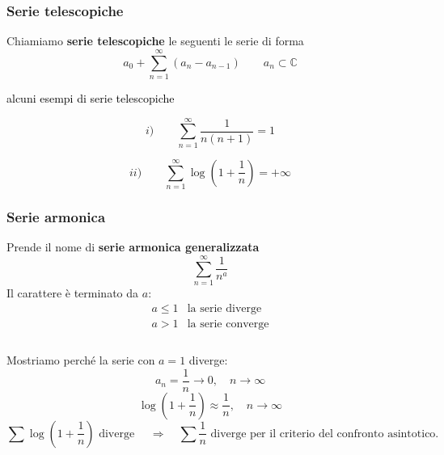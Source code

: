 \documentclass[x11names]{article}
\begin{document}
	\subsubsection{Serie telescopiche}
	Chiamiamo \textbf{serie telescopiche} le seguenti le serie di forma
	\[ 
	a_{0} + \sum_{n=1}^{\infty} (a_{n} - a_{n-1}) \qquad a_{n} \subset \mathbb{C}
	\]
	\begin{es}{\textcolor{black}{alcuni esempi di serie telescopiche}}
		\begin{minipage}{0.5\textwidth}
			\[ 
			i) \qquad \sum_{n=1}^{\infty} \frac{1}{n(n+1)} = 1
			\]
		\end{minipage}
		\begin{minipage}{0.5\textwidth}
			\[ 
			ii) \qquad \sum_{n=1}^{\infty} \log\left(1 + \frac{1}{n}\right) = +\infty
			\]
		\end{minipage}
	\end{es}
	
	\subsubsection{Serie armonica}
	Prende il nome di \textbf{serie armonica generalizzata}
	\[ 
	\sum_{n=1}^\infty \frac{1}{n^a}
	\]
	Il carattere è terminato da \(a\):
	\[ 
	\begin{array}{lc}
		a \leq 1 & \text{la serie diverge} \\
		a > 1  & \text{la serie converge} \\
	\end{array}
	\] \\
	
	\noindent
	Mostriamo perché la serie con \(a=1\) diverge:
	\[ 
	a_{n} = \frac{1}{n} \to 0, \quad n \to \infty
	\]
	\[ 
	\log\left(1+\frac{1}{n}\right) \approx \frac{1}{n}, \quad n \to \infty
	\]
	\[ 
	\sum \log\left(1+\frac{1}{n}\right) \text{ diverge }\quad \Longrightarrow \quad\sum \frac{1}{n} \text{ diverge per il criterio del confronto asintotico.}
	\] \\
	
\end{document}
